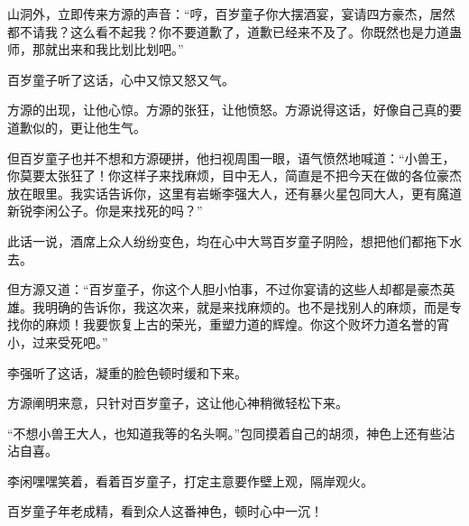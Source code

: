 \begin{this_body}
山洞外，立即传来方源的声音：“哼，百岁童子你大摆酒宴，宴请四方豪杰，居然都不请我？这么看不起我？你不要道歉了，道歉已经来不及了。你既然也是力道蛊师，那就出来和我比划比划吧。”

百岁童子听了这话，心中又惊又怒又气。

方源的出现，让他心惊。方源的张狂，让他愤怒。方源说得这话，好像自己真的要道歉似的，更让他生气。

但百岁童子也并不想和方源硬拼，他扫视周围一眼，语气愤然地喊道：“小兽王，你莫要太张狂了！你这样子来找麻烦，目中无人，简直是不把今天在做的各位豪杰放在眼里。我实话告诉你，这里有岩蜥李强大人，还有暴火星包同大人，更有魔道新锐李闲公子。你是来找死的吗？”

此话一说，酒席上众人纷纷变色，均在心中大骂百岁童子阴险，想把他们都拖下水去。

但方源又道：“百岁童子，你这个人胆小怕事，不过你宴请的这些人却都是豪杰英雄。我明确的告诉你，我这次来，就是来找麻烦的。也不是找别人的麻烦，而是专找你的麻烦！我要恢复上古的荣光，重塑力道的辉煌。你这个败坏力道名誉的宵小，过来受死吧。”

李强听了这话，凝重的脸色顿时缓和下来。

方源阐明来意，只针对百岁童子，这让他心神稍微轻松下来。

“不想小兽王大人，也知道我等的名头啊。”包同摸着自己的胡须，神色上还有些沾沾自喜。

李闲嘿嘿笑着，看着百岁童子，打定主意要作壁上观，隔岸观火。

百岁童子年老成精，看到众人这番神色，顿时心中一沉！

\end{this_body}

